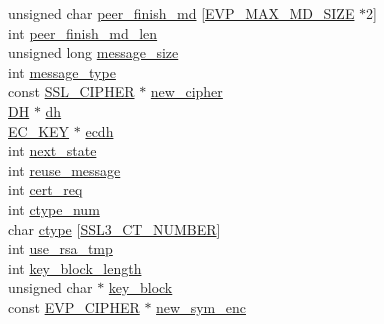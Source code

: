 \begin{DoxyCompactItemize}
\begin{tabbing}
\>unsigned char \hyperlink{structssl3__state__st_a845435cf91f3ac30a4f11b29d25c5930}{peer\_finish\_md} \mbox{[}\hyperlink{include_2openssl_2evp_8h_a71bfc78a168f00f0c4ffd2535082b129}{EVP\_MAX\_MD\_SIZE} $\ast$2\mbox{]}\\
\>int \hyperlink{structssl3__state__st_a283c246476da32831e4ea2377ad6d59b}{peer\_finish\_md\_len}\\
\>unsigned long \hyperlink{structssl3__state__st_a1610dd976a8263e72c00ca04c15e6786}{message\_size}\\
\>int \hyperlink{structssl3__state__st_aa4ee43acabd9844dd67caa5015709b89}{message\_type}\\
\>const \hyperlink{include_2openssl_2ssl_8h_a548d7a5d565a9e0e9bd45c49f8c95701}{SSL\_CIPHER} $\ast$ \hyperlink{structssl3__state__st_a6d0804e086a148c06053dea47812ec91}{new\_cipher}\\
\>\hyperlink{crypto_2ossl__typ_8h_a5a5072cfe75a51d0ff201c0a8d2d68b2}{DH} $\ast$ \hyperlink{structssl3__state__st_a29d3a6b30f8ddddfe73007d3611b3de8}{dh}\\
\>\hyperlink{crypto_2ec_2ec_8h_a756878ae60b2fc17d4217e77ffe5e0d3}{EC\_KEY} $\ast$ \hyperlink{structssl3__state__st_a8167237a6742b7952cba782433b650a1}{ecdh}\\
\>int \hyperlink{structssl3__state__st_ac0c302bc97f010b7f5965faa07b00354}{next\_state}\\
\>int \hyperlink{structssl3__state__st_ae9dbde7814402723439bda7a5c82848a}{reuse\_message}\\
\>int \hyperlink{structssl3__state__st_af3f6e084c68d5c0725a2ae418f5c2ca0}{cert\_req}\\
\>int \hyperlink{structssl3__state__st_a23119eb985819cfb7ddbfba114b3930f}{ctype\_num}\\
\>char \hyperlink{structssl3__state__st_a7aa1f45161d8aa824b0d73d2c38093c0}{ctype} \mbox{[}\hyperlink{ssl_2ssl3_8h_a7448240d77e1c110f38a0eab3d027ee9}{SSL3\_CT\_NUMBER}\mbox{]}\\
\>int \hyperlink{structssl3__state__st_af7d2f98bd72ef426edc1e2ba797231f3}{use\_rsa\_tmp}\\
\>int \hyperlink{structssl3__state__st_adac13d3919b8f55cac70d7f1c164ea92}{key\_block\_length}\\
\>unsigned char $\ast$ \hyperlink{structssl3__state__st_a38030334eea705084c1bcb8804d58409}{key\_block}\\
\>const \hyperlink{crypto_2ossl__typ_8h_a54a8663a8084d45c31f2786156b55405}{EVP\_CIPHER} $\ast$ \hyperlink{structssl3__state__st_ab3f6ae565f494cd1cd873104945d437a}{new\_sym\_enc}\\

\end{tabbing}
\end{DoxyCompactItemize}

